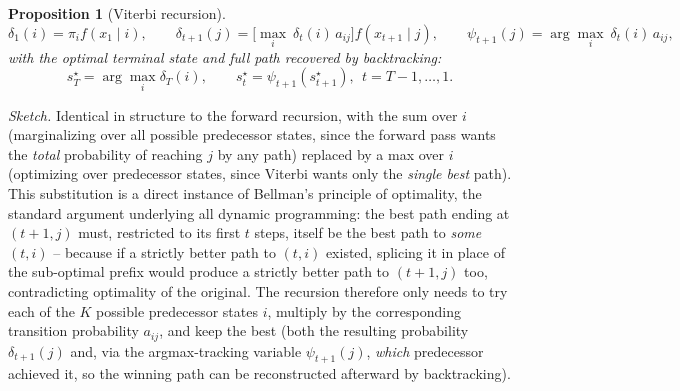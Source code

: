 \documentclass[11pt]{article}
\newtheorem{proposition}[theorem]{Proposition}
\theoremstyle{definition}
\theoremstyle{remark}
\begin{document}
\begin{proposition}[Viterbi recursion]
\[
\delta_1(i)=\pi_if(x_1\mid i), \qquad
\delta_{t+1}(j) = \Big[\max_{i}\ \delta_t(i)\,a_{ij}\Big]f(x_{t+1}\mid j), \qquad
\psi_{t+1}(j) = \arg\max_i\ \delta_t(i)\,a_{ij},
\]
with the optimal terminal state and full path recovered by backtracking:
\[
s_T^{\star}=\arg\max_i\delta_T(i), \qquad s_t^{\star}=\psi_{t+1}(s_{t+1}^{\star}),\ \ t=T-1,\dots,1.
\]
\end{proposition}
\emph{Sketch.} Identical in structure to the forward recursion, with the sum over $i$ (marginalizing over all possible predecessor states, since the forward pass wants the \emph{total} probability of reaching $j$ by any path) replaced by a max over $i$ (optimizing over predecessor states, since Viterbi wants only the \emph{single best} path). This substitution is a direct instance of Bellman's principle of optimality, the standard argument underlying all dynamic programming: the best path ending at $(t+1,j)$ must, restricted to its first $t$ steps, itself be the best path to \emph{some} $(t,i)$ -- because if a strictly better path to $(t,i)$ existed, splicing it in place of the sub-optimal prefix would produce a strictly better path to $(t+1,j)$ too, contradicting optimality of the original. The recursion therefore only needs to try each of the $K$ possible predecessor states $i$, multiply by the corresponding transition probability $a_{ij}$, and keep the best (both the resulting probability $\delta_{t+1}(j)$ and, via the argmax-tracking variable $\psi_{t+1}(j)$, \emph{which} predecessor achieved it, so the winning path can be reconstructed afterward by backtracking).
\end{document}
